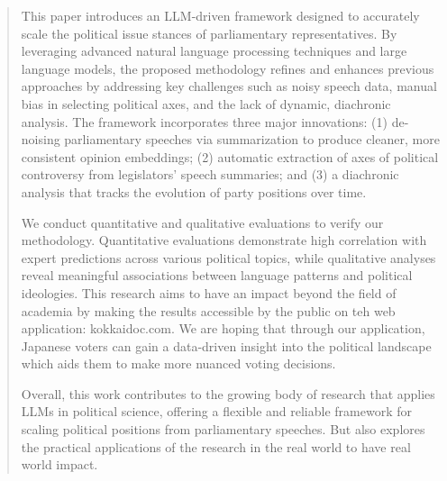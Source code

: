 \documentclass[final,5p,times,twocolumn,authoryear]{elsarticle}
\begin{document}
\begin{frontmatter}
\begin{abstract}
	
	This paper introduces an LLM-driven framework designed to accurately scale the political issue stances of parliamentary representatives. By leveraging advanced natural language processing techniques and large language models, the proposed methodology refines and enhances previous approaches by addressing key challenges such as noisy speech data, manual bias in selecting political axes, and the lack of dynamic, diachronic analysis. The framework incorporates three major innovations: (1) de-noising parliamentary speeches via summarization to produce cleaner, more consistent opinion embeddings; (2) automatic extraction of axes of political controversy from legislators’ speech summaries; and (3) a diachronic analysis that tracks the evolution of party positions over time.
	
	We conduct quantitative and qualitative evaluations to verify our methodology. Quantitative evaluations demonstrate high correlation with expert predictions across various political topics, while qualitative analyses reveal meaningful associations between language patterns and political ideologies. This research aims to have an impact beyond the field of academia by making the results accessible by the public on teh web application: kokkaidoc.com. We are hoping that through our application, Japanese voters can gain a data-driven insight into the political landscape which aids them to make more nuanced voting decisions. 
	
	Overall, this work contributes to the growing body of research that applies LLMs in political science, offering a flexible and reliable framework for scaling political positions from parliamentary speeches. But also explores the practical applications of the research in the real world to have real world impact. 


\end{abstract}
\end{frontmatter}
\end{document}
